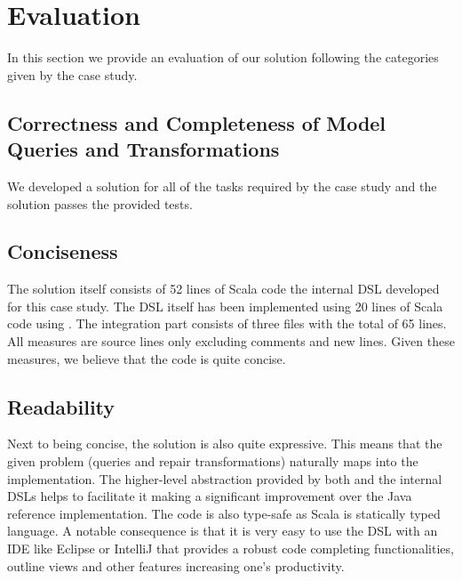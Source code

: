 

\section{Evaluation}
\label{sec:Evaluation}

In this section we provide an evaluation of our solution following the categories given by the case study.

\subsection{Correctness and Completeness of Model Queries and Transformations}

We developed a solution for all of the tasks required by the case study and the solution passes the provided tests.

\subsection{Conciseness}

The solution itself consists of 52 lines of Scala code the internal DSL developed for this case study.
The DSL itself has been implemented using 20 lines of Scala code using \SIGMA.
The integration part consists of three files with the total of 65 lines.
All measures are source lines only excluding comments and new lines.
Given these measures, we believe that the code is quite concise.

\subsection{Readability}

Next to being concise, the solution is also quite expressive.
This means that the given problem (queries and repair transformations) naturally maps into the implementation.
The higher-level abstraction provided by both \SIGMA and the internal DSLs helps to facilitate it making a significant improvement over the Java reference implementation.
%
The code is also type-safe as Scala is statically typed language.
A notable consequence is that it is very easy to use the DSL with an IDE like Eclipse or IntelliJ that provides a robust code completing functionalities, outline views and other features increasing one's productivity.

